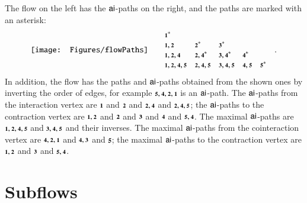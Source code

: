 \begin{example}\label{example:Paths}
The flow on the left has the ${\mathsf{ai}}$-paths on the right, and the paths are marked with an asterisk:
\[
\begin{array}{@{}c@{}c@{}}
\vcenter{\hbox{\texttt{[image: Figures/flowPaths]}}}
\qquad&
\begin{array}{@{}lllll@{}}
\one^*               &                &                  &           &       \\
\one,\two            &\two^*          &\three^*          &           &       \\
\one,\two,\four      &\two,\four^*    &\three,\four^*    &\four^*    &       \\
\one,\two,\four,\five&\two,\four,\five&\three,\four,\five&\four,\five&\five^*\\
\end{array}\quad.
\\
\end{array}
\]
In addition, the flow has the paths and ${\mathsf{ai}}$-paths obtained from the shown ones by inverting the order of edges, for example $\five,\four,\two,\one$ is an ${\mathsf{ai}}$-path. The ${\mathsf{ai}}$-paths from the interaction vertex are $\one$ and $\two$ and $\two,\four$ and $\two,\four,\five$; the ${\mathsf{ai}}$-paths to the contraction vertex are $\one,\two$ and $\two$ and $\three$ and $\four$ and $\five,\four$. The maximal ${\mathsf{ai}}$-paths are $\one,\two,\four,\five$ and $\three,\four,\five$ and their inverses. The maximal ${\mathsf{ai}}$-paths from the cointeraction vertex are $\four,\two,\one$ and $\four,\three$ and $\five$; the maximal ${\mathsf{ai}}$-paths to the contraction vertex are $\one,\two$ and $\three$ and $\five,\four$.
\end{example}

\section{Subflows}\label{section:Subflows}



